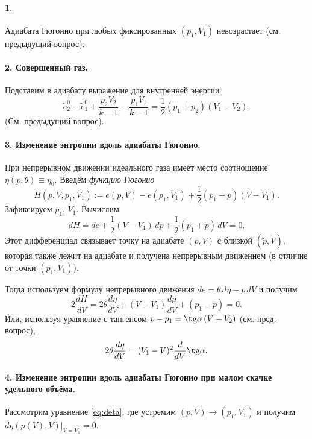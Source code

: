 \paragraph{1.} Адиабата Гюгонио при любых фиксированных $ (p_1, V_1) $ невозрастает
        (см. предыдущий вопрос).

        \paragraph{2. Совершенный газ.} Подставим в адиабату выражение для
        внутренней энергии 
        \[
            \tilde{e}^0_2 - \tilde{e}^0_1 + \frac{p_2 V_2}{k - 1} -
            \frac{p_1V_1}{k-1} = \frac{1}{2} (p_1 + p_2) (V_1 - V_2).
        \]
        (См. предыдущий вопрос).


    \paragraph{3. Изменение энтропии вдоль адиабаты Гюгонио.} При непрерывном
    движении идеального газа имеет место соотношение $ \eta(p, \theta) \equiv
    \eta_0 $. Введём \emph{функцию Гюгонио} 
    \[
            H(p, V, p_1, V_1) := e(p, V) - e(p_1, V_1) + \frac{1}{2}(p_1 + p) (V
            - V_1).
    \]
    Зафиксируем $ p_1 $, $ V_1 $. Вычислим 
    \[
            dH = de + \frac{1}{2} (V - V_1)\, dp + \frac{1}{2} (p_1 + p)\, dV = 0.
    \]
   Этот дифференциал связывает точку на адиабате $ (p, V) $ с близкой $ (\tilde
   p, \tilde V)$, которая также лежит на адиабате и получена непрерывным
   движением (в отличие от точки $ (p_1, V_1) $). 

   Тогда используем формулу непрерывного движения $ de = \theta\, d\eta - p\, dV
   $ и получим  
   \begin{equation}
       \label{eq:deta}
       2\frac{dH}{dV} = 2\theta \frac{d\eta}{dV} + (V - V_1) \frac{dp}{dV} + (p_1 - p) = 0.
   \end{equation}
   Или, используя уравнение с тангенсом $ p - p_1 =  \tg\alpha \, (V - V_2) $
   (см. пред. вопрос), 
   \[
           2\theta \frac{d\eta}{dV} = (V_1 - V)^2 \frac{d}{dV} \tg \alpha.
   \]
   
\paragraph{4. Изменение энтропии вдоль адиабаты Гюгонио при малом скачке
удельного объёма.}
Рассмотрим уравнение \eqref{eq:deta}, где устремим $ (p, V) \to (p_1, V_1) $ и
получим $ d\eta (p(V), V) |_{V=V_1} = 0 $.

